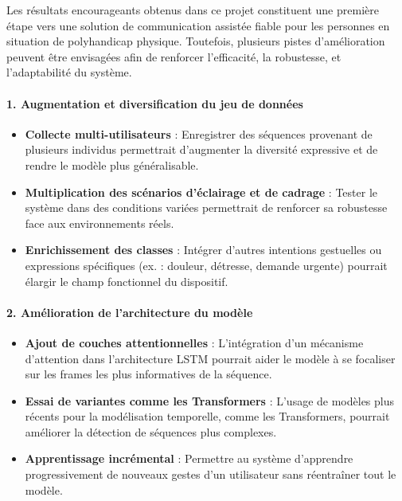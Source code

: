\documentclass[
]{article}
\begin{document}
Les résultats encourageants obtenus dans ce projet constituent une première étape vers une solution de communication assistée fiable pour les personnes en situation de polyhandicap physique. Toutefois, plusieurs pistes d'amélioration peuvent être envisagées afin de renforcer l'efficacité, la robustesse, et l'adaptabilité du système.

\hypertarget{augmentation-et-diversification-du-jeu-de-donnuxe9es}{%
\paragraph{\texorpdfstring{\textbf{1. Augmentation et diversification du jeu de données}}{1. Augmentation et diversification du jeu de données}}\label{augmentation-et-diversification-du-jeu-de-donnuxe9es}}

\begin{itemize}
\item
  \textbf{Collecte multi-utilisateurs} : Enregistrer des séquences provenant de plusieurs individus permettrait d'augmenter la diversité expressive et de rendre le modèle plus généralisable.
\item
  \textbf{Multiplication des scénarios d'éclairage et de cadrage} : Tester le système dans des conditions variées permettrait de renforcer sa robustesse face aux environnements réels.
\item
  \textbf{Enrichissement des classes} : Intégrer d'autres intentions gestuelles ou expressions spécifiques (ex. : douleur, détresse, demande urgente) pourrait élargir le champ fonctionnel du dispositif.
\end{itemize}

\hypertarget{amuxe9lioration-de-larchitecture-du-moduxe8le}{%
\paragraph{\texorpdfstring{\textbf{2. Amélioration de l'architecture du modèle}}{2. Amélioration de l'architecture du modèle}}\label{amuxe9lioration-de-larchitecture-du-moduxe8le}}

\begin{itemize}
\item
  \textbf{Ajout de couches attentionnelles} : L'intégration d'un mécanisme d'attention dans l'architecture LSTM pourrait aider le modèle à se focaliser sur les frames les plus informatives de la séquence.
\item
  \textbf{Essai de variantes comme les Transformers} : L'usage de modèles plus récents pour la modélisation temporelle, comme les Transformers, pourrait améliorer la détection de séquences plus complexes.
\item
  \textbf{Apprentissage incrémental} : Permettre au système d'apprendre progressivement de nouveaux gestes d'un utilisateur sans réentraîner tout le modèle.
\end{itemize}
\end{document}
